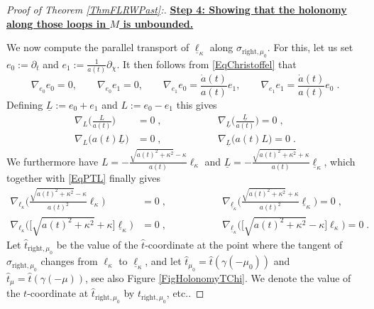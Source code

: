 \documentclass[reqno]{article}
\begin{document}
\begin{proof}[Proof of Theorem \ref{ThmFLRWPast}:]
\underline{\textbf{Step 4: Showing that the holonomy along those loops in $M$ is unbounded.}}

We now compute the parallel transport of $\underline{\ell}_\kappa$ along $\sigma_{\mathrm{right}, \mu_0}$. For this, let us set $e_0 := \partial_t$ and $e_1 := \frac{1}{a(t)} \partial_\chi$. It then follows from \eqref{EqChristoffel} that
\begin{equation*}
\nabla_{e_0} e_0 = 0, \qquad \nabla_{e_0} e_1 = 0, \qquad \nabla_{e_1} e_0 = \frac{\dot{a}(t)}{a(t)} e_1, \qquad \nabla_{e_1} e_1 = \frac{\dot{a}(t)}{a(t)} e_0 \;.
\end{equation*}
Defining $\underline{L} := e_0 + e_1$ and $L := e_0 - e_1$ this gives
\begin{equation}\label{EqPTL}
\begin{aligned}
\nabla_L \Big( \frac{L}{a(t)} \Big) &= 0\;, \qquad \qquad &&\nabla_{\underline{L}}\Big( \frac{\underline{L}}{a(t)}\Big) =0\;, \\
\nabla_{L}\big(a(t) \underline{L}\big) &=0\;, \qquad \qquad &&\nabla_{\underline{L}} \big(a(t) L\big) =0 \;.
\end{aligned}
\end{equation}
We furthermore have $L = - \frac{\sqrt{a(t)^2 + \kappa^2} - \kappa}{a(t)} \ell_\kappa$ and $\underline{L} = - \frac{\sqrt{a(t)^2 + \kappa^2} + \kappa}{a(t)} \underline{\ell}_\kappa$, which together with \eqref{EqPTL} finally gives
\begin{equation}
\label{EqPTell}
\begin{aligned}
\nabla_{\ell_\kappa} \Big(\frac{\sqrt{a(t)^2 + \kappa^2} - \kappa}{a(t)^2} \ell_\kappa\Big) &= 0 \;, \qquad \qquad &&\nabla_{\underline{\ell}_\kappa} \Big( \frac{\sqrt{a(t)^2 + \kappa^2} + \kappa}{a(t)^2} \underline{\ell}_\kappa\Big) = 0\;, \\
\nabla_{\ell_\kappa} \Big( \big[ \sqrt{a(t)^2 + \kappa^2} + \kappa\big] \underline{\ell}_\kappa\Big) &=0 \;, \qquad \qquad &&\nabla_{\underline{\ell}_{\kappa}} \Big(\big[ \sqrt{a(t)^2 + \kappa^2} - \kappa\big]\ell_\kappa\Big) =0 \;.
\end{aligned}
\end{equation}
Let $\hat{t}_{\mathrm{right},\mu_0}$ be the value of the $\hat{t}$-coordinate at the point where the tangent of $\sigma_{\mathrm{right}, \mu_0}$ changes from $\ell_\kappa$ to $\underline{\ell}_\kappa$, and let $\hat{t}_{\mu_0} = \hat{t}(\gamma(-\mu_0))$ and $\hat{t}_{\mu} = \hat{t}(\gamma(-\mu))$, see also Figure \ref{FigHolonomyTChi}. We denote the value of the $t$-coordinate at $\hat{t}_{\mathrm{right},\mu_0}$ by $t_{\mathrm{right}, \mu_0}$, etc.. 

\end{proof}
\end{document}
